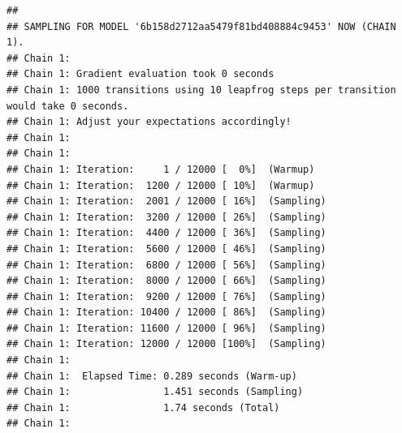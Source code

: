 \documentclass[
]{book}
\begin{document}
\begin{verbatim}
## 
## SAMPLING FOR MODEL '6b158d2712aa5479f81bd408884c9453' NOW (CHAIN 1).
## Chain 1: 
## Chain 1: Gradient evaluation took 0 seconds
## Chain 1: 1000 transitions using 10 leapfrog steps per transition would take 0 seconds.
## Chain 1: Adjust your expectations accordingly!
## Chain 1: 
## Chain 1: 
## Chain 1: Iteration:     1 / 12000 [  0%]  (Warmup)
## Chain 1: Iteration:  1200 / 12000 [ 10%]  (Warmup)
## Chain 1: Iteration:  2001 / 12000 [ 16%]  (Sampling)
## Chain 1: Iteration:  3200 / 12000 [ 26%]  (Sampling)
## Chain 1: Iteration:  4400 / 12000 [ 36%]  (Sampling)
## Chain 1: Iteration:  5600 / 12000 [ 46%]  (Sampling)
## Chain 1: Iteration:  6800 / 12000 [ 56%]  (Sampling)
## Chain 1: Iteration:  8000 / 12000 [ 66%]  (Sampling)
## Chain 1: Iteration:  9200 / 12000 [ 76%]  (Sampling)
## Chain 1: Iteration: 10400 / 12000 [ 86%]  (Sampling)
## Chain 1: Iteration: 11600 / 12000 [ 96%]  (Sampling)
## Chain 1: Iteration: 12000 / 12000 [100%]  (Sampling)
## Chain 1: 
## Chain 1:  Elapsed Time: 0.289 seconds (Warm-up)
## Chain 1:                1.451 seconds (Sampling)
## Chain 1:                1.74 seconds (Total)
## Chain 1:
\end{verbatim}
\end{document}
